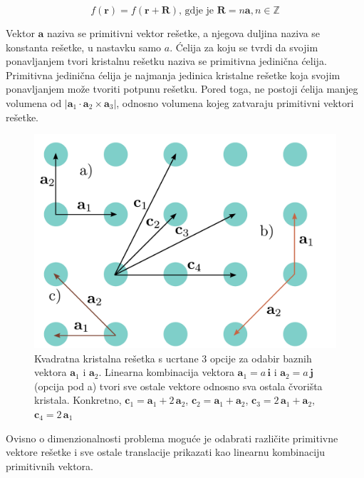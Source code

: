 \documentclass[utf8, seminar, numeric]{fer}
\begin{document}
\begin{equation}
	f(\mathbf{r}) = f(\mathbf{r} + \mathbf{R}) \text{, gdje je }{\mathbf{R} =
	n\mathbf{a}}, n \in \mathbb{Z}
\end{equation}

Vektor $\mathbf{a}$ naziva se primitivni vektor rešetke, a njegova duljina
naziva se konstanta rešetke, u nastavku samo $a$. Ćelija za koju se tvrdi
da svojim ponavljanjem tvori kristalnu rešetku naziva se primitivna jedinična
ćelija. Primitivna jedinična ćelija je najmanja jedinica kristalne rešetke koja
svojim ponavljanjem može tvoriti potpunu rešetku. Pored toga, ne postoji ćelija
manjeg volumena od ${|\mathbf{a}_1 \cdot \mathbf{a}_2 \times \mathbf{a}_3|}$,
odnosno volumena kojeg zatvaraju primitivni vektori rešetke.

\begin{figure}[ht]
	\centering
	\includegraphics[width = 0.9\linewidth]{./images/pdf/crystal_lattice.pdf}
	\caption{Kvadratna kristalna rešetka s ucrtane 3 opcije za odabir baznih
	vektora $\mathbf{a}_1$ i $\mathbf{a}_2$. Linearna kombinacija vektora
	$\mathbf{a}_1 = a \, \mathbf{i}$ i $\mathbf{a}_2 = a \, \mathbf{j}$ (opcija
	pod a) tvori sve ostale vektore odnosno sva ostala čvorišta kristala.
	Konkretno,
	${\mathbf{c}_1 = \mathbf{a}_1 + 2 \, \mathbf{a}_2}$,
	${\mathbf{c}_2 = \mathbf{a}_1 + \mathbf{a}_2}$,
	${\mathbf{c}_3 = 2 \, \mathbf{a}_1 + \mathbf{a}_2}$,
	${\mathbf{c}_4 = 2 \, \mathbf{a}_1}$}
	\label{fig:crystal_lattice}
\end{figure}

Ovisno o dimenzionalnosti problema moguće je odabrati različite primitivne
vektore rešetke i sve ostale translacije prikazati kao linearnu kombinaciju
primitivnih vektora.
\end{document}
